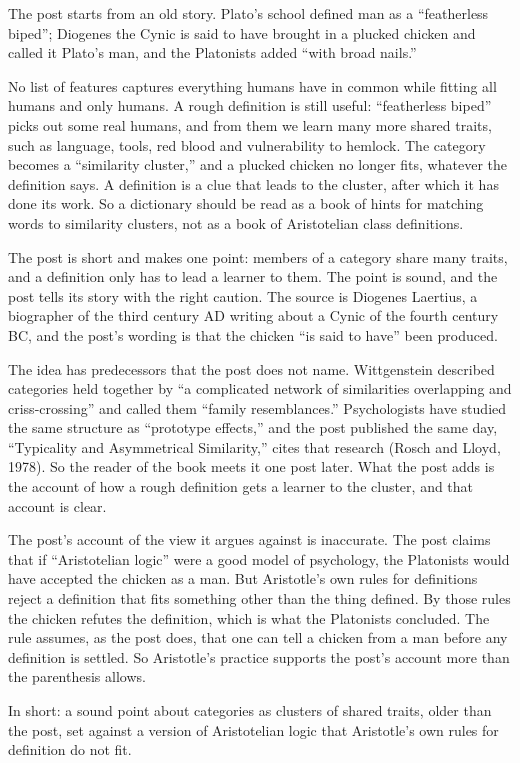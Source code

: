 \begin{afterword}
\summaryhead

The post starts from an old story. Plato's school defined man as a ``featherless biped''; Diogenes the Cynic is said to have brought in a plucked chicken and called it Plato's man, and the Platonists added ``with broad nails.''

No list of features captures everything humans have in common while fitting all humans and only humans. A rough definition is still useful: ``featherless biped'' picks out some real humans, and from them we learn many more shared traits, such as language, tools, red blood and vulnerability to hemlock. The category becomes a ``similarity cluster,'' and a plucked chicken no longer fits, whatever the definition says. A definition is a clue that leads to the cluster, after which it has done its work. So a dictionary should be read as a book of hints for matching words to similarity clusters, not as a book of Aristotelian class definitions.

\responsehead

The post is short and makes one point: members of a category share many traits, and a definition only has to lead a learner to them. The point is sound, and the post tells its story with the right caution. The source is Diogenes Laertius, a biographer of the third century AD writing about a Cynic of the fourth century BC, and the post's wording is that the chicken ``is said to have'' been produced.

The idea has predecessors that the post does not name. Wittgenstein described categories held together by ``a complicated network of similarities overlapping and criss-crossing'' and called them ``family resemblances.'' Psychologists have studied the same structure as ``prototype effects,'' and the post published the same day, ``Typicality and Asymmetrical Similarity,'' cites that research (Rosch and Lloyd, 1978). So the reader of the book meets it one post later. What the post adds is the account of how a rough definition gets a learner to the cluster, and that account is clear.

The post's account of the view it argues against is inaccurate. The post claims that if ``Aristotelian logic'' were a good model of psychology, the Platonists would have accepted the chicken as a man. But Aristotle's own rules for definitions reject a definition that fits something other than the thing defined. By those rules the chicken refutes the definition, which is what the Platonists concluded. The rule assumes, as the post does, that one can tell a chicken from a man before any definition is settled. So Aristotle's practice supports the post's account more than the parenthesis allows.

In short: a sound point about categories as clusters of shared traits, older than the post, set against a version of Aristotelian logic that Aristotle's own rules for definition do not fit.
\end{afterword}

